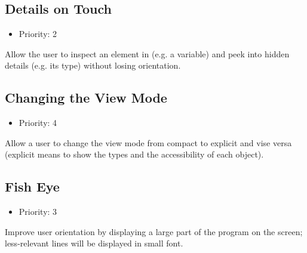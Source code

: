 \subsection{Details on Touch}
\begin{itemize}
	\item Priority: 2
\end{itemize}
Allow the user to inspect an element in (e.g. a variable) and peek into hidden details (e.g. its type) without losing orientation.
\subsection{Changing the View Mode}
\begin{itemize}
	\item Priority: 4
\end{itemize}
Allow a user to change the view mode from compact to explicit and vise versa (explicit means to show the types and the accessibility of each object).
\subsection{Fish Eye}
\begin{itemize}
	\item Priority: 3
\end{itemize}
Improve user orientation by displaying a large part of the program on the screen; less-relevant lines will be displayed in small font.
